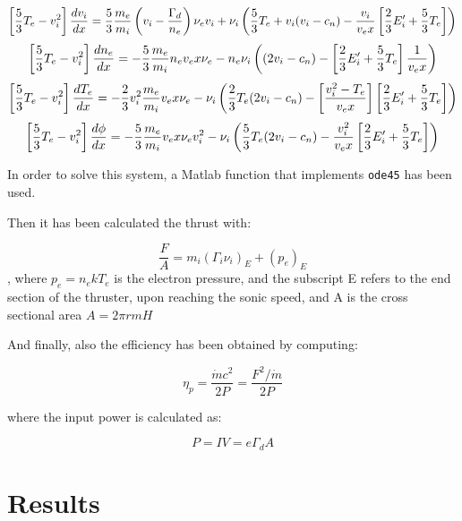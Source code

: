 \begin{equation}
	\small
	\left[\frac{5}{3}T_e-v_i^2\right]\frac{dv_{i}}{dx} = \frac{5}{3}\frac{m_e}{m_i}\left(v_i-\frac{\Gamma_d}{n_e}\right)\nu_e v_i + \nu_i\left(\frac{5}{3}T_e + v_i(v_i-c_n)-\frac{v_i}{v_ex}\left[\frac{2}{3}E_i'+\frac{5}{3}T_e\right]\right)
\end{equation}
\begin{equation}
	\small
	\left[\frac{5}{3}T_e-v_i^2\right]\frac{d n_{e}}{dx} = -\frac{5}{3}\frac{m_e}{m_i}n_e v_ex\nu_e - n_e\nu_i\left((2v_i-c_n)-\left[\frac{2}{3}E_i'+\frac{5}{3}T_e\right]\frac{1}{v_ex}\right)
\end{equation}
\begin{equation}
	\small
	\left[\frac{5}{3}T_e-v_i^2\right]\frac{d T_{e}}{dx} = -\frac{2}{3}v_i^2\frac{m_e}{m_i}v_ex\nu_e-\nu_i\left(\frac{2}{3}T_e(2v_i-c_n)-\left[\frac{v_i^2-T_e}{v_ex}\right]\left[\frac{2}{3}E_i'+\frac{5}{3}T_e\right]\right)
\end{equation}
\begin{equation}
	\small
	\left[\frac{5}{3}T_e-v_i^2\right]\frac{d{\phi}}{dx} = -\frac{5}{3}\frac{m_e}{m_i}v_ex\nu_e v_i^2-\nu_i\left(\frac{5}{3}T_e(2v_i-c_n)-\frac{v_i^2}{v_ex}\left[\frac{2}{3}E_i'+\frac{5}{3}T_e\right]\right)
\end{equation}

In order to solve this system, a Matlab function that implements \texttt{ode45}
has been used.

Then it has been calculated the thrust with:

\begin{equation}
	\frac{F}{A} = m_i(\Gamma_i \nu_i)_E + (p_e)_E
\end{equation}
, where $p_e = n_e kT_e$ is the electron pressure, and the subscript E refers to
the end section of the thruster, upon reaching the sonic speed, and A is the
cross sectional area $A = 2\pi r m H$

And finally, also the efficiency has been obtained by computing:

\begin{equation}
	\eta_p = \frac{\dot{m}c^2}{2P} = \frac{F^2/\dot{m}}{2P}
\end{equation}

where the input power is calculated as:

\begin{equation}
	P = I V = e \Gamma_d A
\end{equation}

\section{Results}

